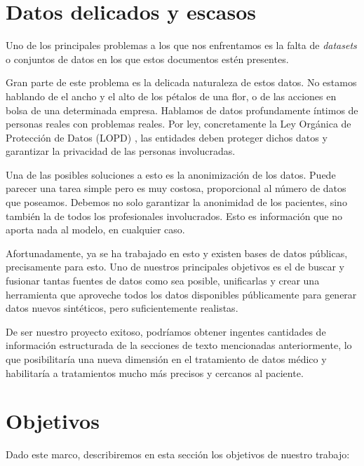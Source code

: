 \section{Datos delicados y escasos}
Uno de los principales problemas a los que nos enfrentamos es la falta de \textit{datasets} o conjuntos de datos en los que estos documentos estén presentes. 

Gran parte de este problema es la delicada naturaleza de estos datos. No estamos hablando de el ancho y el alto de los pétalos de una flor, o de las acciones en bolsa de una determinada empresa. Hablamos de datos profundamente íntimos de personas reales con problemas reales. Por ley, concretamente la Ley Orgánica de Protección de Datos (LOPD) \cite{LOPD}, las entidades deben proteger dichos datos y garantizar la privacidad de las personas involucradas.

Una de las posibles soluciones a esto es la anonimización de los datos. Puede parecer una tarea simple pero es muy costosa, proporcional al número de datos que poseamos. Debemos no solo garantizar la anonimidad de los pacientes, sino también la de todos los profesionales involucrados. Esto es información que no aporta nada al modelo, en cualquier caso. 

Afortunadamente, ya se ha trabajado en esto y existen bases de datos públicas, precisamente para esto. Uno de nuestros principales objetivos es el de buscar y fusionar tantas fuentes de datos como sea posible, unificarlas y crear una herramienta que aproveche todos los datos disponibles públicamente para generar datos nuevos sintéticos, pero suficientemente realistas.

De ser nuestro proyecto exitoso, podríamos obtener ingentes cantidades de información estructurada de la secciones de texto mencionadas anteriormente, lo que posibilitaría una nueva dimensión en el tratamiento de datos médico y habilitaría a tratamientos mucho más precisos y cercanos al paciente.

\section{Objetivos}
Dado este marco, describiremos en esta sección los objetivos de nuestro trabajo:

